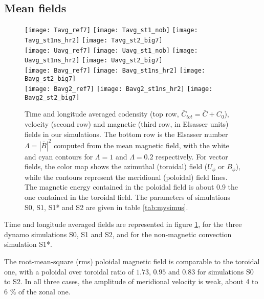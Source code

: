\documentclass[12pt, a4paper]{article}
\begin{document}
\subsection{Mean fields}

\begin{figure}
\texttt{[image: Tavg\_ref7]}
\texttt{[image: Tavg\_st1\_nob]}
\texttt{[image: Tavg\_st1ns\_hr2]}
\texttt{[image: Tavg\_st2\_big7]} \\
\texttt{[image: Uavg\_ref7]}
\texttt{[image: Uavg\_st1\_nob]} 
\texttt{[image: Uavg\_st1ns\_hr2]} 
\texttt{[image: Uavg\_st2\_big7]} \\
\texttt{[image: Bavg\_ref7]}
\hspace{0.24\linewidth}
\texttt{[image: Bavg\_st1ns\_hr2]}
\texttt{[image: Bavg\_st2\_big7]} \\
\texttt{[image: Bavg2\_ref7]}
\hspace{0.24\linewidth}
\texttt{[image: Bavg2\_st1ns\_hr2]}
\texttt{[image: Bavg2\_st2\_big7]}
\caption{Time and longitude averaged codensity (top row, $\bar{C}_{tot}=\bar{C}+C_0$), velocity (second row) and magnetic (third row, in Elsasser units) fields in our simulations.
The bottom row is the Elsasser number $\Lambda = |\bar{B}|^2$ computed from the mean magnetic field, with the white and cyan contours for $\Lambda=1$ and $\Lambda=0.2$ respectively.
For vector fields, the color map shows the azimuthal (toroidal) field ($U_\phi$ or $B_\phi$), while the contours represent the meridional (poloidal) field lines.
The magnetic energy contained in the poloidal field is about 0.9 the one contained in the toroidal field.
The parameters of simulations S0, S1, S1* and S2 are given in table \ref{tab:mysimus}.
}
\label{fig:avg}
\end{figure}

Time and longitude averaged fields are represented in figure \ref{fig:avg}, for the three dynamo simulations S0, S1 and S2, and for the non-magnetic convection simulation S1*.

The root-mean-square (rms) poloidal magnetic field is comparable to the toroidal one, with a poloidal over toroidal ratio of $1.73$, $0.95$ and $0.83$ for simulations S0 to S2.
In all three cases, the amplitude of meridional velocity is weak, about 4 to 6 \% of the zonal one.
\end{document}
